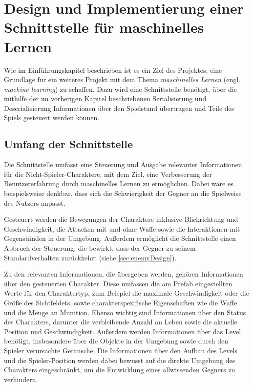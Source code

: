 \section{Design und Implementierung einer Schnittstelle für maschinelles Lernen}\label{sec:aiInterface}

Wie im Einführungskapitel beschrieben ist es ein Ziel des Projektes, eine Grundlage für ein weiteres Projekt mit dem Thema \textit{maschinelles Lernen} (engl. \textit{machine learning}) zu schaffen. Dazu wird eine Schnittstelle benötigt, über die mithilfe der im vorherigen Kapitel beschriebenen Serialisierung und Deserialisierung Informationen über den Spielstand übertragen und Teile des Spiels gesteuert werden können.

\subsection{Umfang der Schnittstelle}\label{sec:interfaceDesign}

Die Schnittstelle umfasst eine Steuerung und Ausgabe relevanter Informationen für die Nicht-Spieler-Charaktere, mit dem Ziel, eine Verbesserung der Benutzererfahrung durch maschinelles Lernen zu ermöglichen. Dabei wäre es beispielsweise denkbar, dass sich die Schwierigkeit der Gegner an die Spielweise des Nutzers anpasst.

Gesteuert werden die Bewegungen der Charaktere inklusive Blickrichtung und Geschwindigkeit, die Attacken mit und ohne Waffe sowie die Interaktionen mit Gegenständen in der Umgebung. Außerdem ermöglicht die Schnittstelle einen Abbruch der Steuerung, die bewirkt, dass der Gegner zu seinem Standardverhalten zurückkehrt (siehe \ref{sec:enemyDesign}).

Zu den relevanten Informationen, die übergeben werden, gehören Informationen über den gesteuerten Charakter. Diese umfassen die am Prefab eingestellten Werte für den Charaktertyp, zum Beispiel die maximale Geschwindigkeit oder die Größe des Sichtfeldets, sowie charakterspezifische Eigenschaften wie die Waffe und die Menge an Munition. Ebenso wichtig sind Informationen über den Status des Charakters, darunter die verbleibende Anzahl an Leben sowie die aktuelle Position und Geschwindigkeit. Außerdem werden Informationen über das Level benötigt, insbesondere über die Objekte in der Umgebung sowie durch den Spieler verursachte Geräusche. Die Informationen über den Aufbau des Levels und die Spieler-Position werden dabei bewusst auf die direkte Umgebung des Charakters eingeschränkt, um die Entwicklung eines allwissenden Gegners zu verhindern.

